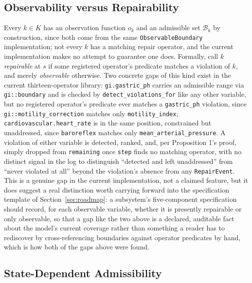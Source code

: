 \documentclass[11pt]{article}
\begin{document}
\subsection{Observability versus Repairability}

Every $k \in K$ has an observation function $o_k$ and an admissible set $\mathcal B_k$ by construction, since both come from the same \texttt{ObservableBoundary} implementation; not every $k$ has a matching repair operator, and the current implementation makes no attempt to guarantee one does. Formally, call $k$ \emph{repairable} at $s$ if some registered operator's predicate matches a violation of $k$, and merely \emph{observable} otherwise. Two concrete gaps of this kind exist in the current thirteen-operator library: \texttt{gi.gastric\_ph} carries an admissible range via \texttt{gi::boundary} and is checked by \texttt{detect\_violations\_for} like any other variable, but no registered operator's predicate ever matches a \texttt{gastric\_ph} violation, since \texttt{gi::motility\_correction} matches only \texttt{motility\_index}; \texttt{cardiovascular.heart\_rate} is in the same position, constrained but unaddressed, since \texttt{baroreflex} matches only \texttt{mean\_arterial\_pressure}. A violation of either variable is detected, ranked, and, per Proposition 1's proof, simply dropped from \texttt{remaining} once \texttt{step} finds no matching operator, with no distinct signal in the log to distinguish ``detected and left unaddressed'' from ``never violated at all'' beyond the violation's absence from any \texttt{RepairEvent}. This is a genuine gap in the current implementation, not a claimed feature, but it does suggest a real distinction worth carrying forward into the specification template of Section~\ref{sec:roadmap}: a subsystem's five-component specification should record, for each observable variable, whether it is presently repairable or only observable, so that a gap like the two above is a declared, auditable fact about the model's current coverage rather than something a reader has to rediscover by cross-referencing boundaries against operator predicates by hand, which is how both of the gaps above were found.

\subsection{State-Dependent Admissibility}
\end{document}
